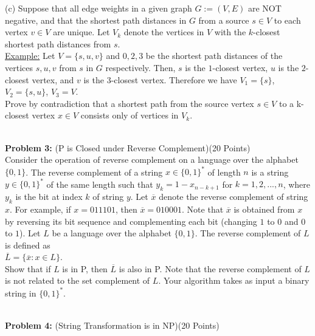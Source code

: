 \documentclass[11pt]{amsart}
\begin{document}
(c) Suppose that all edge weights in a given graph $G:=(V,E)$ are NOT negative, and that the shortest path distances in $G$ from a source $s\in V$ to each vertex $v\in V$ are unique. Let $V_k$ denote the vertices in $V$ with the $k$-closest shortest path distances from $s$.\\

\underline{Example:} Let $V=\{s, u, v\}$ and $0, 2, 3$ be the shortest path distances of the vertices  $s, u, v$ from $s$ in $G$ respectively. Then, $s$ is the $1$-closest vertex, $u$ is the $2$-closest vertex, and $v$ is the $3$-closest vertex. Therefore we have $V_1= \{s\}$, $V_2=\{s,u\}$, $V_3=V$.\\ 

Prove by contradiction that a shortest path from the source vertex $s\in V$ to a k-closest vertex $x\in V$ consists only of vertices in $V_k$.

\newpage
\hrulefill \\
\textbf{Problem 3:} (P is Closed under Reverse Complement)\hfill (20 Points)\\

Consider the operation of reverse complement on a language over the alphabet $\{ 0, 1\}$. The reverse complement of a string $x \in \{ 0, 1 \}^*$ of length $n$ is a string $y \in \{ 0, 1 \}^*$ of the same length such that $y_k = 1 - x_{n-k+1}$ for $k = 1, 2, ..., n$, where $y_k$ is the bit at index $k$ of string $y$. Let $\overline{x}$ denote the reverse complement of string $x$. For example, if $x = 011101$, then $\overline{x} = 010001$. Note that $\overline{x}$ is obtained from  $x$ by reversing its bit sequence
and complementing each bit (changing $1$ to $0$ and $0$ to $1$). Let $L$ be a language over the alphabet $\{ 0, 1\}$. The reverse complement of $L$ is defined as \\

$\overline{L} = \{ \overline{x} : x \in L \}$. \\

Show that if $L$ is in P, then $\overline{L}$ is also in P. Note that the reverse complement of $L$ is not related to the set complement of $L$. Your algorithm takes as input a binary string in $\{ 0, 1 \}^*$.

\newpage
\hrulefill \\
\textbf{Problem 4:} (String Transformation is in NP)\hfill (20 Points)\\
\end{document}
